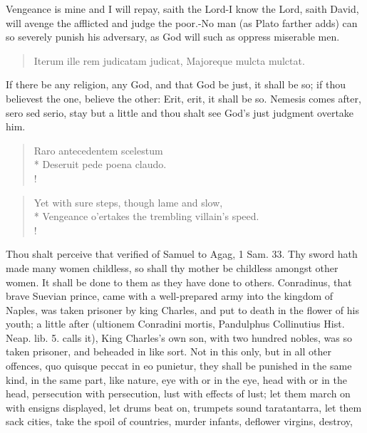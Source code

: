 {Vengeance is mine and I will repay, saith the Lord-I know the
Lord, saith David, will avenge the afflicted and judge the
poor.-No man (as Plato farther adds) can so severely punish his
adversary, as God will such as oppress miserable men.
%
%
\begin{latin}%
\begin{verse}%
Iterum ille rem judicatam judicat,
Majoreque mulcta mulctat.
\end{verse}%
\end{latin}%
%
If there be any religion, any God, and that God be just, it shall be
so; if thou believest the one, believe the other: Erit, erit, it shall
be so. Nemesis comes after, sero sed serio, stay but a little and thou
shalt see God's just judgment overtake him.
%
%
\begin{latin}%
\begin{verse}%
Raro antecedentem scelestum\\*
Deseruit pede poena claudo.\\!
\end{verse}
\end{latin}
\translationrule%
\begin{verse}%
Yet with sure steps, though lame and slow,\\*
Vengeance o'ertakes the trembling villain's speed.\\!
\end{verse}%
%
Thou shalt perceive that verified of Samuel to Agag, 1 Sam.  33. Thy
sword hath made many women childless, so shall thy mother be childless
amongst other women. It shall be done to them as they have done to
others. Conradinus, that brave Suevian prince, came with a
well-prepared army into the kingdom of Naples, was taken prisoner by
king Charles, and put to death in the flower of his youth; a little
after (ultionem Conradini mortis, Pandulphus Collinutius Hist. Neap.
lib. 5. calls it), King Charles's own son, with two hundred nobles, was
so taken prisoner, and beheaded in like sort. Not in this only, but in
all other offences, quo quisque peccat in eo punietur, they shall
be punished in the same kind, in the same part, like nature, eye with
or in the eye, head with or in the head, persecution with persecution,
lust with effects of lust; let them march on with ensigns displayed,
let drums beat on, trumpets sound taratantarra, let them sack cities,
take the spoil of countries, murder infants, deflower virgins, destroy,
}
